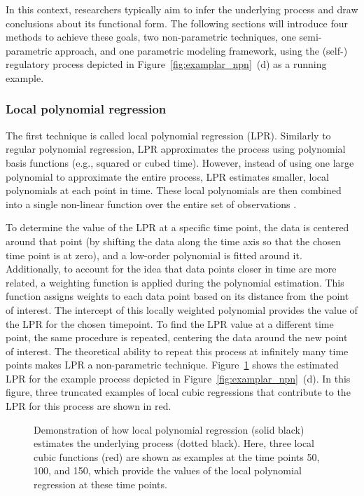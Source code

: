 \documentclass[man, floatsintext]{apa7}
\begin{document}
In this context, researchers typically aim to infer the underlying process and
draw conclusions about its functional form. The following sections will
introduce four methods to achieve these goals, two non-parametric techniques,
one semi-parametric approach, and one parametric modeling framework, using the
(self-) regulatory process depicted in Figure~\ref{fig:examplar_npn}~(d)
as a running example.

\subsubsection{Local polynomial regression}

The first technique is called local polynomial regression (LPR). Similarly to
regular polynomial regression, LPR approximates the process using polynomial
basis functions (e.g., squared or cubed time). However, instead of using one
large polynomial to approximate the entire process, LPR estimates smaller,
local polynomials at each point in time. These local polynomials are then
combined into a single non-linear function over the entire set of observations
\parencite{fan_adaptive_1995, ruppert_multivariate_1994, fan_local_2018}.

To determine the value of the LPR at a specific time point, the data is
centered around that point (by shifting the data along the time axis so
that the chosen time point is at zero), and a low-order polynomial is fitted
around it. Additionally, to account for the idea that data points closer in
time are more related, a weighting function is applied during the polynomial
estimation. This function assigns weights to each data point based on its
distance from the point of interest. The intercept of this locally weighted
polynomial provides the value of the LPR for the chosen timepoint.
To find the LPR value at a different time
point, the same procedure is repeated, centering the data around the new point
of interest. The theoretical ability to repeat this process at infinitely many
time points makes LPR a non-parametric technique. Figure~\ref{fig:locpol_dem}
shows the estimated LPR for the example process depicted in
Figure~\ref{fig:examplar_npn}~(d).  In this figure, three truncated examples of
local cubic regressions that contribute to the LPR for this process are shown
in red.\@

\begin{figure}[!ht]
  \caption{Demonstration of how local polynomial regression (solid black)
    estimates the underlying process (dotted black). Here, three local cubic
    functions (red) are shown as examples at the time points 50, 100, and 150,
    which provide the values of the local polynomial regression at these time
    points.}
  \label{fig:locpol_dem}
\end{figure}
\end{document}

